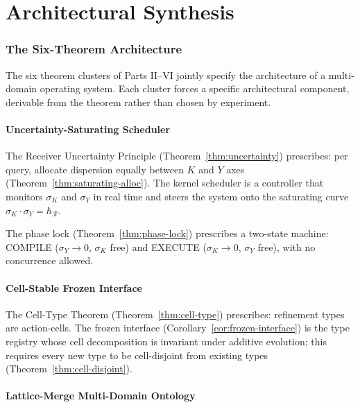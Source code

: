 \documentclass[twocolumn,11pt,a4paper]{article}
\newcommand{\receiver}{\mathcal{R}}
\newcommand{\hbarR}{\hbar_{\receiver}}
\newcommand{\disp}{\sigma}
\begin{document}
\part{Architectural Synthesis}

\section{The Six-Theorem Architecture}
\label{sec:architecture}

The six theorem clusters of Parts II--VI jointly specify the architecture of a multi-domain operating system. Each cluster forces a specific architectural component, derivable from the theorem rather than chosen by experiment.

\subsection{Uncertainty-Saturating Scheduler}

The Receiver Uncertainty Principle (Theorem~\ref{thm:uncertainty}) prescribes: per query, allocate dispersion equally between $K$ and $Y$ axes (Theorem~\ref{thm:saturating-alloc}). The kernel scheduler is a controller that monitors $\disp_K$ and $\disp_Y$ in real time and steers the system onto the saturating curve $\disp_K \cdot \disp_Y = \hbarR$.

The phase lock (Theorem~\ref{thm:phase-lock}) prescribes a two-state machine: COMPILE ($\disp_Y \to 0$, $\disp_K$ free) and EXECUTE ($\disp_K \to 0$, $\disp_Y$ free), with no concurrence allowed.

\subsection{Cell-Stable Frozen Interface}

The Cell-Type Theorem (Theorem~\ref{thm:cell-type}) prescribes: refinement types are action-cells. The frozen interface (Corollary~\ref{cor:frozen-interface}) is the type registry whose cell decomposition is invariant under additive evolution; this requires every new type to be cell-disjoint from existing types (Theorem~\ref{thm:cell-disjoint}).

\subsection{Lattice-Merge Multi-Domain Ontology}
\end{document}
